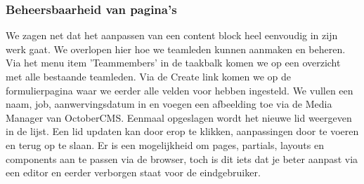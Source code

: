 \pagebreak

\subsubsection{Beheersbaarheid van pagina's}
We zagen net dat het aanpassen van een content block heel eenvoudig in zijn werk gaat. We overlopen hier hoe we teamleden kunnen aanmaken en beheren. 
\newline\newline
Via het menu item 'Teammembers' in de taakbalk komen we op een overzicht met alle bestaande teamleden. Via de Create link komen we op de formulierpagina waar we eerder alle velden voor hebben ingesteld. We vullen een naam, job, aanwervingsdatum in en voegen een afbeelding toe via de Media Manager van OctoberCMS. Eenmaal opgeslagen wordt het nieuwe lid weergeven in de lijst. Een lid updaten kan door erop te klikken, aanpassingen door te voeren en terug op te slaan. 
\newline\newline
Er is een mogelijkheid om pages, partials, layouts en components aan te passen via de browser, toch is dit iets dat je beter aanpast via een editor en eerder verborgen staat voor de eindgebruiker. 